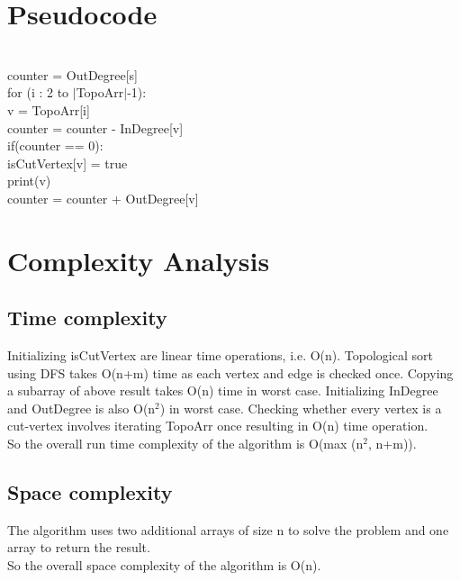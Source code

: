 \documentclass{article}
\begin{document}
\section{Pseudocode}
\begin{algorithm}
\begin{algorithmic}[1]
    \\
        \hspace{20pt}counter = OutDegree[s]\\
        \hspace{20pt}for (i : 2 to $|$TopoArr$|$-1):\\
        \hspace{40pt}v = TopoArr[i]\\
        \hspace{40pt}counter = counter - InDegree[v]\\
        \hspace{40pt}if(counter == 0):\\
        \hspace{60pt}isCutVertex[v] = true\\
        \hspace{60pt}print(v)\\
        \hspace{40pt}counter = counter + OutDegree[v]
    \EndFunction
\end{algorithmic}
\end{algorithm}


\section{Complexity Analysis}
\subsection{Time complexity}
Initializing isCutVertex are linear time operations, i.e. O(n). Topological sort using DFS takes O(n+m) time as each vertex and edge is checked once. Copying a subarray of above result takes O(n) time in worst case. Initializing InDegree and OutDegree is also O(n$^{2}$) in worst case. Checking whether every vertex is a cut-vertex involves iterating TopoArr once resulting in O(n) time operation.
\\So the overall run time complexity of the algorithm is O(max (n$^{2}$, n+m)).

\subsection{Space complexity}
The algorithm uses two additional arrays of size n to solve the problem and one array to return the result.
\\So the overall space complexity of the algorithm is O(n).
\end{document}
